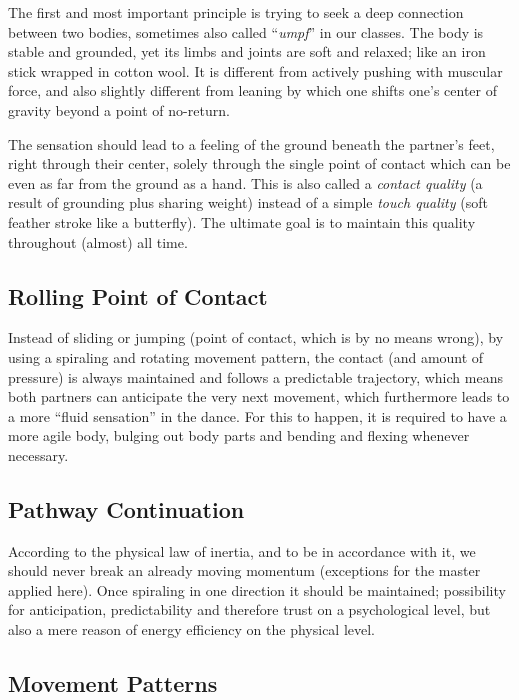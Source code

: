 The first and most important principle is trying to seek a deep connection between two bodies, sometimes also called ``\textit{umpf}'' in our classes.
The body is stable and grounded, yet its limbs and joints are soft and relaxed; like an iron stick wrapped in cotton wool.
It is different from actively pushing with muscular force, and also slightly different from leaning by which one shifts one's center of gravity beyond a point of no-return.

The sensation should lead to a feeling of the ground beneath the partner's feet, right through their center, solely through the single point of contact which can be even as far from the ground as a hand.
This is also called a \textit{contact quality} (a result of grounding plus sharing weight) instead of a simple \textit{touch quality} (soft feather stroke like a butterfly).
The ultimate goal is to maintain this quality throughout (almost)  all time.

\subsection{Rolling Point of Contact}\label{subsec:rolling-point-of-contact}

Instead of sliding or jumping (point of contact, which is by no means wrong), by using a spiraling and rotating movement pattern, the contact (and amount of pressure) is always maintained and follows a predictable trajectory, which means both partners can anticipate the very next movement, which furthermore leads to a more ``fluid sensation'' in the dance.
For this to happen, it is required to have a more agile body, bulging out body parts and bending and flexing whenever necessary.

\subsection{Pathway Continuation}\label{subsec:pathway-continuation}

According to the physical law of inertia, and to be in accordance with it, we should never break an already moving momentum (exceptions for the master applied here).
Once spiraling in one direction it should be maintained; possibility for anticipation, predictability and therefore trust on a psychological level, but also a mere reason of energy efficiency on the physical level.

\subsection{Movement Patterns}\label{subsec:movement-patterns}

